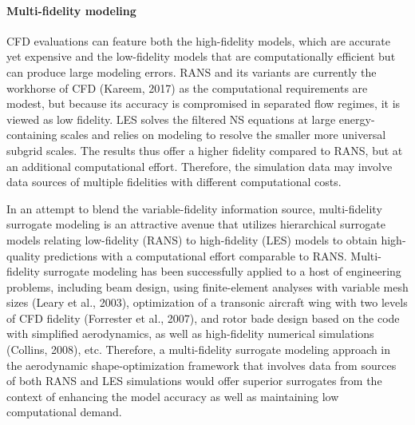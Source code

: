 \paragraph{Multi-fidelity modeling} CFD evaluations can feature both the high-fidelity models, which are accurate yet expensive and the low-fidelity models that are computationally efficient but can produce large modeling errors. RANS and its variants are currently the workhorse of CFD (Kareem, 2017) as the computational requirements are modest, but because its accuracy is compromised in separated flow regimes, it is viewed as low fidelity. LES solves the filtered NS equations at large energy-containing scales and relies on modeling to resolve the smaller more universal subgrid scales. The results thus offer a higher fidelity compared to RANS, but at an additional computational effort. Therefore, the simulation data may involve data sources of multiple fidelities with different computational costs.

In an attempt to blend the variable-fidelity information source, multi-fidelity surrogate modeling is an attractive avenue that utilizes hierarchical surrogate models relating low-fidelity (RANS) to high-fidelity (LES) models to obtain high-quality predictions with a computational effort comparable to RANS. Multi-fidelity surrogate modeling has been successfully applied to a host of engineering problems, including beam design, using finite-element analyses with variable mesh sizes (Leary et al., 2003), optimization of a transonic aircraft wing with two levels of CFD fidelity (Forrester et al., 2007), and rotor bade design based on the code with simplified aerodynamics, as well as high-fidelity numerical simulations (Collins, 2008), etc. Therefore, a multi-fidelity surrogate modeling approach in the aerodynamic shape-optimization framework that involves data from sources of both RANS and LES simulations would offer superior surrogates from the context of enhancing the model accuracy as well as maintaining low computational demand.


